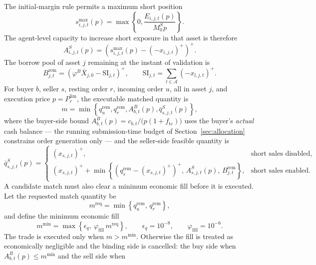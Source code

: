 \documentclass[12pt, a4paper]{article}
\newcommand{\pospart}[1]{\left(#1\right)^{+}}
\begin{document}
    The initial-margin rule permits a maximum short position
    \[
        s_{i,j,t}^{\max}(p)
        =
        \max\left\{0,\frac{E_{i,j,t}(p)}{M_0^{S}p}\right\}.
    \]
    The agent-level capacity to increase short exposure in that asset is therefore
    \[
        A_{i,j,t}^{S}(p)=\pospart{s_{i,j,t}^{\max}(p)-\pospart{-x_{i,j,t}}}.
    \]
    The borrow pool of asset \(j\) remaining at the instant of validation is
    \[
        B_{j,t}^{\mathrm{rem}}
        =
        \pospart{\varphi^{B}\bar X_{j,0}-\mathrm{SI}_{j,t}},
        \qquad
        \mathrm{SI}_{j,t}=\sum_{l\in\mathcal{A}}\pospart{-x_{l,j,t}}.
    \]
    For buyer \(b\), seller \(s\), resting order \(r\), incoming order \(u\), all in
    asset \(j\), and execution price \(p=P_{r}^{\text{lim}}\), the executable
    matched quantity is
    \[
        m
        =
        \min\left\{
                q_{u}^{\mathrm{rem}},
            q_{r}^{\mathrm{rem}},
                A_{b,t}^{B}(p),
                \bar q_{s,j,t}^{S}(p)
        \right\},
    \]
    where the buyer-side bound \(A_{b,t}^{B}(p)=c_{b,t}/\bigl(p(1+f_{\mathrm{tc}})\bigr)\)
    uses the buyer's \emph{actual} cash balance --- the running submission-time
    budget of Section~\ref{sec:allocation} constrains order generation only --- and
    the seller-side feasible quantity is
    \[
        \bar q_{s,j,t}^{S}(p)=
        \begin{cases}
            \pospart{x_{s,j,t}}, & \text{short sales disabled},\\[1ex]
            \pospart{x_{s,j,t}}
            +
            \min\left\{
                    \pospart{q_{s}^{\mathrm{rem}}-\pospart{x_{s,j,t}}},\,
                    A_{s,j,t}^{S}(p),\,
                    B_{j,t}^{\mathrm{rem}}
            \right\}, & \text{short sales enabled}.
        \end{cases}
    \]
    A candidate match must also clear a minimum economic fill before it is
    executed. Let the requested match quantity be
    \[
        m^{\mathrm{req}}
        =
        \min\left\{q_{u}^{\mathrm{rem}},\,q_{r}^{\mathrm{rem}}\right\},
    \]
    and define the minimum economic fill
    \[
        m^{\min}
        =
        \max\left\{\epsilon_q,\ \varphi_{\mathrm{fill}}\,m^{\mathrm{req}}\right\},
        \qquad
        \epsilon_q=10^{-8},
        \qquad
        \varphi_{\mathrm{fill}}=10^{-6}.
    \]
    The trade is executed only when \(m>m^{\min}\). Otherwise the fill is treated
    as economically negligible and the binding side is cancelled: the buy side
    when \(A_{b,t}^{B}(p)\le m^{\min}\) and the sell side when
\end{document}
